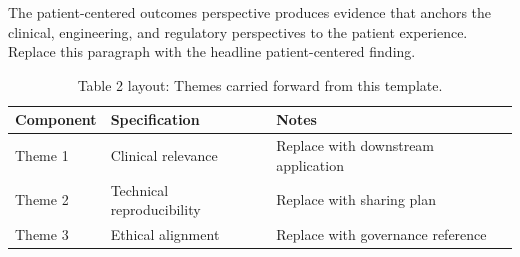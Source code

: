 
The patient-centered outcomes perspective produces evidence that anchors the clinical, engineering, and regulatory perspectives to the patient experience. Replace this paragraph with the headline patient-centered finding.

\begin{table}[H]
\caption{Table 2 layout: Themes carried forward from this template.}
\label{tab:conclusions_themes}
\centering
\begin{tabular}{>{\raggedright\arraybackslash}p{3.4cm} >{\raggedright\arraybackslash}p{4.6cm} >{\raggedright\arraybackslash}p{5.4cm}}
\toprule
\textbf{Component} & \textbf{Specification} & \textbf{Notes} \\
\midrule
  Theme 1 & Clinical relevance & Replace with downstream application \\
  Theme 2 & Technical reproducibility & Replace with sharing plan \\
  Theme 3 & Ethical alignment & Replace with governance reference \\
\bottomrule
\end{tabular}
\end{table}
